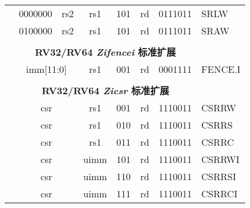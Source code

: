 \begin{table}[p]
\begin{small}
\begin{center}
\begin{tabular}{p{0in}p{0.4in}p{0.05in}p{0.05in}p{0.05in}p{0.05in}p{0.4in}p{0.6in}p{0.4in}p{0.6in}p{0.7in}l}
&
\multicolumn{4}{|c|}{0000000} &
\multicolumn{2}{c|}{rs2} &
\multicolumn{1}{c|}{rs1} &
\multicolumn{1}{c|}{101} &
\multicolumn{1}{c|}{rd} &
\multicolumn{1}{c|}{0111011} & SRLW \\
\cline{2-11}


&
\multicolumn{4}{|c|}{0100000} &
\multicolumn{2}{c|}{rs2} &
\multicolumn{1}{c|}{rs1} &
\multicolumn{1}{c|}{101} &
\multicolumn{1}{c|}{rd} &
\multicolumn{1}{c|}{0111011} & SRAW \\
\cline{2-11}


&
\multicolumn{10}{c}{} & \\
&
\multicolumn{10}{c}{\bf RV32/RV64 \emph{Zifencei} 标准扩展} & \\
\cline{2-11}


&
\multicolumn{6}{|c|}{imm[11:0]} &
\multicolumn{1}{c|}{rs1} &
\multicolumn{1}{c|}{001} &
\multicolumn{1}{c|}{rd} &
\multicolumn{1}{c|}{0001111} & FENCE.I \\
\cline{2-11}


&
\multicolumn{10}{c}{} & \\
&
\multicolumn{10}{c}{\bf RV32/RV64 \emph{Zicsr} 标准扩展} & \\
\cline{2-11}


&
\multicolumn{6}{|c|}{csr} &
\multicolumn{1}{c|}{rs1} &
\multicolumn{1}{c|}{001} &
\multicolumn{1}{c|}{rd} &
\multicolumn{1}{c|}{1110011} & CSRRW \\
\cline{2-11}


&
\multicolumn{6}{|c|}{csr} &
\multicolumn{1}{c|}{rs1} &
\multicolumn{1}{c|}{010} &
\multicolumn{1}{c|}{rd} &
\multicolumn{1}{c|}{1110011} & CSRRS \\
\cline{2-11}


&
\multicolumn{6}{|c|}{csr} &
\multicolumn{1}{c|}{rs1} &
\multicolumn{1}{c|}{011} &
\multicolumn{1}{c|}{rd} &
\multicolumn{1}{c|}{1110011} & CSRRC \\
\cline{2-11}


&
\multicolumn{6}{|c|}{csr} &
\multicolumn{1}{c|}{uimm} &
\multicolumn{1}{c|}{101} &
\multicolumn{1}{c|}{rd} &
\multicolumn{1}{c|}{1110011} & CSRRWI \\
\cline{2-11}


&
\multicolumn{6}{|c|}{csr} &
\multicolumn{1}{c|}{uimm} &
\multicolumn{1}{c|}{110} &
\multicolumn{1}{c|}{rd} &
\multicolumn{1}{c|}{1110011} & CSRRSI \\
\cline{2-11}


&
\multicolumn{6}{|c|}{csr} &
\multicolumn{1}{c|}{uimm} &
\multicolumn{1}{c|}{111} &
\multicolumn{1}{c|}{rd} &
\multicolumn{1}{c|}{1110011} & CSRRCI \\
\cline{2-11}



\end{tabular}
\end{center}
\end{small}
\end{table}
